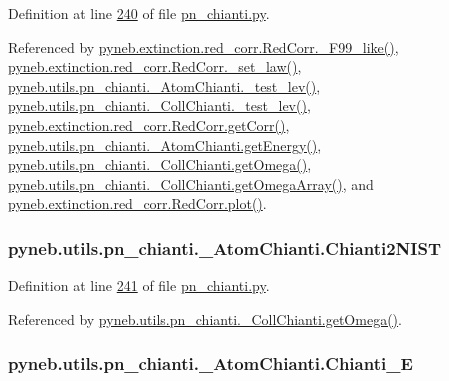 Definition at line \hyperlink{pn__chianti_8py_source_l00240}{240} of file \hyperlink{pn__chianti_8py_source}{pn\-\_\-chianti.\-py}.



Referenced by \hyperlink{red__corr_8py_source_l00658}{pyneb.\-extinction.\-red\-\_\-corr.\-Red\-Corr.\-\_\-\-F99\-\_\-like()}, \hyperlink{red__corr_8py_source_l00176}{pyneb.\-extinction.\-red\-\_\-corr.\-Red\-Corr.\-\_\-set\-\_\-law()}, \hyperlink{pn__chianti_8py_source_l00304}{pyneb.\-utils.\-pn\-\_\-chianti.\-\_\-\-Atom\-Chianti.\-\_\-test\-\_\-lev()}, \hyperlink{pn__chianti_8py_source_l00472}{pyneb.\-utils.\-pn\-\_\-chianti.\-\_\-\-Coll\-Chianti.\-\_\-test\-\_\-lev()}, \hyperlink{red__corr_8py_source_l00211}{pyneb.\-extinction.\-red\-\_\-corr.\-Red\-Corr.\-get\-Corr()}, \hyperlink{pn__chianti_8py_source_l00366}{pyneb.\-utils.\-pn\-\_\-chianti.\-\_\-\-Atom\-Chianti.\-get\-Energy()}, \hyperlink{pn__chianti_8py_source_l00507}{pyneb.\-utils.\-pn\-\_\-chianti.\-\_\-\-Coll\-Chianti.\-get\-Omega()}, \hyperlink{pn__chianti_8py_source_l00484}{pyneb.\-utils.\-pn\-\_\-chianti.\-\_\-\-Coll\-Chianti.\-get\-Omega\-Array()}, and \hyperlink{red__corr_8py_source_l00303}{pyneb.\-extinction.\-red\-\_\-corr.\-Red\-Corr.\-plot()}.

\hypertarget{classpyneb_1_1utils_1_1pn__chianti_1_1___atom_chianti_af40dabefe9f067611af9696725412980}{
\subsubsection[{Chianti2\-N\-I\-S\-T}]{\setlength{\rightskip}{0pt plus 5cm}pyneb.\-utils.\-pn\-\_\-chianti.\-\_\-\-Atom\-Chianti.\-Chianti2\-N\-I\-S\-T}}\label{classpyneb_1_1utils_1_1pn__chianti_1_1___atom_chianti_af40dabefe9f067611af9696725412980}


Definition at line \hyperlink{pn__chianti_8py_source_l00241}{241} of file \hyperlink{pn__chianti_8py_source}{pn\-\_\-chianti.\-py}.



Referenced by \hyperlink{pn__chianti_8py_source_l00507}{pyneb.\-utils.\-pn\-\_\-chianti.\-\_\-\-Coll\-Chianti.\-get\-Omega()}.

\hypertarget{classpyneb_1_1utils_1_1pn__chianti_1_1___atom_chianti_ad3eb8ed7f4cb58a7806dd820b22f3d37}{
\subsubsection[{Chianti\-\_\-\-E}]{\setlength{\rightskip}{0pt plus 5cm}pyneb.\-utils.\-pn\-\_\-chianti.\-\_\-\-Atom\-Chianti.\-Chianti\-\_\-\-E}}\label{classpyneb_1_1utils_1_1pn__chianti_1_1___atom_chianti_ad3eb8ed7f4cb58a7806dd820b22f3d37}


